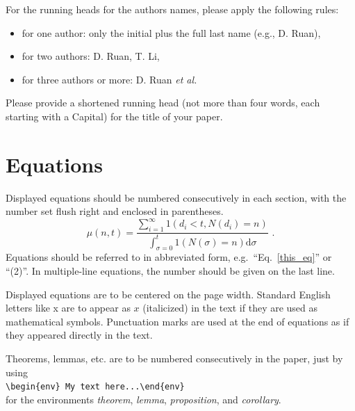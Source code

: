 \documentclass[11pt,twoside]{article}
\begin{document}
\begin{multicols}{2}
For the running heads for the authors names, please apply the following rules:
\begin{itemize}\Nospacing
\item for one author: only the initial plus the full last name (e.g., D. Ruan),
\item for two authors: D. Ruan, T. Li,
\item for three authors or more: D. Ruan \emph{et al.}
\end{itemize}
\smallskip

\noindent
Please provide a shortened running head (not more than four words, each starting with a Capital) for the title of your paper. 
\section{Equations}

Displayed equations should be numbered consecutively in each section, with the number set flush right and enclosed in parentheses.
\begin{equation}
\mu(n,t) = \frac{\displaystyle\sum^\infty_{i=1} 1(d_i < t, N(d_i) = n)}
{\displaystyle\int^t_{\sigma=0} 1(N(\sigma) = n)\mathrm{d}\sigma}\,\, .
\label{this_eq}
\end{equation}
Equations should be referred to in abbreviated form, e.g.~``Eq.~\eqref{this_eq}'' or ``(2)''. In multiple-line equations, the number should be given on the last line.

Displayed equations are to be centered on the page width. Standard English letters like x are to appear as $x$ (italicized) in the text if they are used as mathematical symbols. Punctuation marks are used at the end of equations as if they appeared directly in the text.

\begin{theorem}
Theorems, lemmas, etc. are to be numbered consecutively in the paper, just by using \\
\verb+\begin{env} My text here...\end{env}+ \\
for the environments \emph{theorem}, \emph{lemma}, \emph{proposition}, and \emph{corollary}.
\end{theorem}



\end{multicols}
\end{document}
